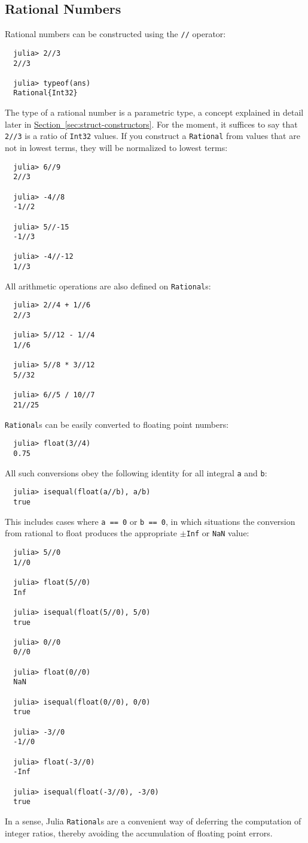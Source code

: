 \documentclass{article}
\newcommand{\Section}[1]{\hyperref[sec:#1]{Section~\ref*{sec:#1}}}
\begin{document}
\subsection{Rational Numbers}

Rational numbers can be constructed using the \texttt{//} operator:
\begin{verbatim}
  julia> 2//3
  2//3

  julia> typeof(ans)
  Rational{Int32}
\end{verbatim}
The type of a rational number is a parametric type, a concept explained in detail later in \Section{struct-constructors}.
For the moment, it suffices to say that \verb|2//3| is a ratio of \verb|Int32| values.
If you construct a \verb|Rational| from values that are not in lowest terms, they will be normalized to lowest terms:
\begin{verbatim}
  julia> 6//9
  2//3

  julia> -4//8
  -1//2

  julia> 5//-15
  -1//3

  julia> -4//-12
  1//3
\end{verbatim}
All arithmetic operations are also defined on \verb|Rational|s:
\begin{verbatim}
  julia> 2//4 + 1//6
  2//3

  julia> 5//12 - 1//4
  1//6

  julia> 5//8 * 3//12
  5//32

  julia> 6//5 / 10//7
  21//25
\end{verbatim}
\verb|Rational|s can be easily converted to floating point numbers:
\begin{verbatim}
  julia> float(3//4)
  0.75
\end{verbatim}
All such conversions obey the following identity for all integral \verb|a| and \verb|b|:
\begin{verbatim}
  julia> isequal(float(a//b), a/b)
  true
\end{verbatim}
This includes cases where \verb|a == 0| or \verb|b == 0|, in which situations the conversion from rational to float produces the appropriate $\pm$\verb|Inf| or \verb|NaN| value:
\begin{verbatim}
  julia> 5//0
  1//0

  julia> float(5//0)
  Inf

  julia> isequal(float(5//0), 5/0)
  true

  julia> 0//0
  0//0

  julia> float(0//0)
  NaN

  julia> isequal(float(0//0), 0/0)
  true

  julia> -3//0
  -1//0

  julia> float(-3//0)
  -Inf

  julia> isequal(float(-3//0), -3/0)
  true
\end{verbatim}
In a sense, Julia \verb|Rational|s are a convenient way of deferring the computation of integer ratios, thereby avoiding the accumulation of floating point errors.
\end{document}
